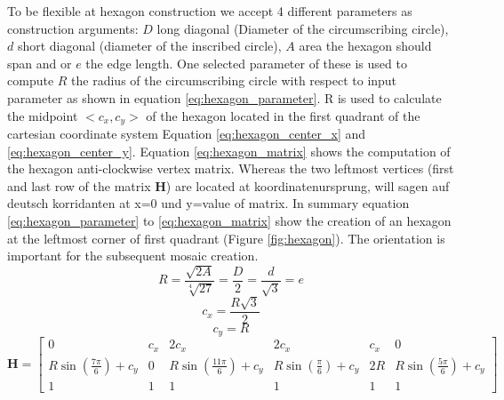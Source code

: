 		To be flexible at hexagon construction we accept 4 different parameters as construction arguments: $D$ long diagonal (Diameter of the circumscribing circle), $d$ short diagonal (diameter of the inscribed circle), $A$ area the hexagon should span and or $e$ the edge length. One selected parameter of these is used to compute $R$ the radius of the circumscribing circle with respect to input parameter as shown in  equation \ref{eq:hexagon_parameter}. R is used to calculate the midpoint $<c_x, c_y>$ of the hexagon located in the first quadrant of the cartesian coordinate system Equation \ref{eq:hexagon_center_x} and \ref{eq:hexagon_center_y}. Equation \ref{eq:hexagon_matrix} shows the computation of the hexagon anti-clockwise vertex matrix. Whereas the two leftmost vertices (first and last row of the matrix $\textbf{H}$) are located at koordinatenursprung, will sagen auf deutsch korridanten at x=0 und y=value of matrix. In summary equation \ref{eq:hexagon_parameter} to \ref{eq:hexagon_matrix} show the creation of an hexagon at the leftmost corner of first quadrant (Figure \ref{fig:hexagon}). The orientation is important for the subsequent mosaic creation.
		\begin{equation}
		\label{eq:hexagon_parameter}
			R = \frac{\sqrt{2A}}{\sqrt[4]{27}} = \frac{D}{2} = \frac{d}{\sqrt{3}} = e
		\end{equation}
		\begin{equation}
		\label{eq:hexagon_center_x}
			c_x = \frac{R\sqrt{3}}{2} 
		\end{equation}
		\begin{equation}
		\label{eq:hexagon_center_y}
			c_y = R
		\end{equation}
		\begin{equation}
		\label{eq:hexagon_matrix}
			\mathbf{H} =
			\begin{bmatrix}
				0 & c_x & 2c_x & 2c_x & c_x & 0 \\
				R\sin\left(\frac{7\pi}{6}\right) + c_y & 0 & R\sin\left(\frac{11\pi}{6}\right)+c_y & R\sin\left(\frac{\pi}{6}\right)+c_y & 2R & R\sin\left(\frac{5\pi}{6}\right)+c_y \\
				1 & 1 & 1 & 1 & 1 & 1
			\end{bmatrix}
		\end{equation}

